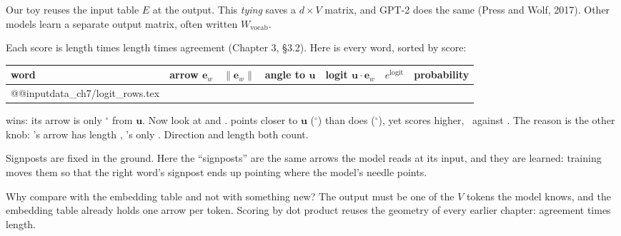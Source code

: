 \par\medskip\noindent\begin{minipage}{\linewidth}\centering

\end{minipage}\par\medskip
 Our toy reuses the input table $E$ at
the output. This \emph{tying} saves a $d\times V$ matrix, and GPT-2 does the same (Press and Wolf, 2017). Other
models learn a separate output matrix, often written $W_{\text{vocab}}$.

Each score is length times length times agreement (Chapter 3, \S3.2). Here is every word, sorted by score:

\begin{center}
\small
\begin{tabular}{@{}l c c c r r r@{}}
\toprule
word & arrow $\bm{e}_w$ & $\lVert\bm{e}_w\rVert$ & angle to $\bm{u}$ & logit $\bm{u}\cdot\bm{e}_w$ & $e^{\text{logit}}$ & probability\\
\midrule
\csname @@input\endcsname data_ch7/logit_rows.tex
\bottomrule
\end{tabular}
\end{center}

 wins: its arrow is only \nSevenAngSorry$^\circ$ from $\bm{u}$. Now look at  and .
 points closer to $\bm{u}$ (\nSevenAngOf$^\circ$) than  does (\nSevenAngBeen$^\circ$), yet 
scores higher, \nSevenLogitBeen\ against \nSevenLogitOf. The reason is the other knob: 's arrow has
length \nSevenLenBeen, 's only \nSevenLenOf. Direction and length both count.

\begin{breaks}
Signposts are fixed in the ground. Here the ``signposts'' are the same arrows the model reads at its input, and
they are learned: training moves them so that the right word's signpost ends up pointing where the model's needle
points.
\end{breaks}

\Why Why compare with the embedding table and not with something new? The output must be one of the $V$ tokens the
model knows, and the embedding table already holds one arrow per token. Scoring by dot product reuses the
geometry of every earlier chapter: agreement times length.

